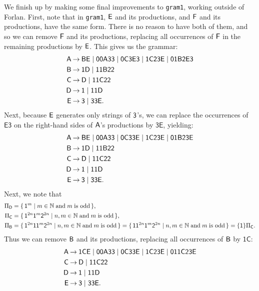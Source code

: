 We finish up by making some final improvements to \texttt{gram1},
working outside of Forlan. First, note that in \texttt{gram1}, $\mathsf{E}$
and its productions, and $\mathsf{F}$ and its productions, have the same
form. There is no reason to have both of them, and so we can remove
$\mathsf{F}$ and its productions, replacing all occurrences of $\mathsf{F}$ in
the remaining productions by $\mathsf{E}$. This gives us the grammar:
\begin{align*}
\mathsf{A} &\mathbin{\to} \mathsf{BE} \mid \mathsf{00A33} \mid \mathsf{0C3E3} \mid
  \mathsf{1C23E} \mid \mathsf{01B2E3} \\
\mathsf{B} &\mathbin{\to} \mathsf{1D} \mid \mathsf{11B22} \\
\mathsf{C} &\mathbin{\to} \mathsf{D} \mid \mathsf{11C22} \\
\mathsf{D} &\mathbin{\to} \mathsf{1} \mid \mathsf{11D} \\
\mathsf{E} &\mathbin{\to} \mathsf{3} \mid \mathsf{33E} .
\end{align*}
Next, because $\mathsf{E}$ generates only strings of $\mathsf{3}$'s, we
can replace the occurrences of $\mathsf{E3}$ on the right-hand sides
of $\mathsf{A}$'s productions by $\mathsf{3E}$, yielding:
\begin{align*}
\mathsf{A} &\mathbin{\to} \mathsf{BE} \mid \mathsf{00A33} \mid \mathsf{0C33E} \mid
  \mathsf{1C23E} \mid \mathsf{01B23E} \\
\mathsf{B} &\mathbin{\to} \mathsf{1D} \mid \mathsf{11B22} \\
\mathsf{C} &\mathbin{\to} \mathsf{D} \mid \mathsf{11C22} \\
\mathsf{D} &\mathbin{\to} \mathsf{1} \mid \mathsf{11D} \\
\mathsf{E} &\mathbin{\to} \mathsf{3} \mid \mathsf{33E} .
\end{align*}
Next, we note that
\begin{align*}
  \Pi_{\mathsf{D}} &= \{ \, \mathsf{1}^m \mid m\in\mathbb{N}\;\allowbreak\mbox{and}\allowbreak\; m \;\allowbreak\mbox{is odd}\allowbreak \, \} , \\
  \Pi_{\mathsf{C}} &= \{ \, \mathsf{1}^{2n}\mathsf{1}^m\mathsf{2}^{2n} \mid n,m\in\mathbb{N}\;\allowbreak\mbox{and}\allowbreak\;
    m \;\allowbreak\mbox{is odd}\allowbreak \, \} , \\
  \Pi_{\mathsf{B}} &= \{ \, \mathsf{1}^{2n}\mathsf{1}\mathsf{1}^m\mathsf{2}^{2n} \mid n,m\in\mathbb{N}\;\allowbreak\mbox{and}\allowbreak\;
    m \;\allowbreak\mbox{is odd}\allowbreak \, \} =
    \{ \, \mathsf{1}\mathsf{1}^{2n}\mathsf{1}^m\mathsf{2}^{2n} \mid n,m\in\mathbb{N}\;\allowbreak\mbox{and}\allowbreak\;
    m \;\allowbreak\mbox{is odd}\allowbreak \, \} = \{\mathsf{1}\}\Pi_{\mathsf{C}} .
\end{align*}
Thus we can remove $\mathsf{B}$ and its productions, replacing all occurrences of
$\mathsf{B}$ by $\mathsf{1C}$:
\begin{align*}
\mathsf{A} &\mathbin{\to} \mathsf{1CE} \mid \mathsf{00A33} \mid \mathsf{0C33E} \mid
  \mathsf{1C23E} \mid \mathsf{011C23E} \\
\mathsf{C} &\mathbin{\to} \mathsf{D} \mid \mathsf{11C22} \\
\mathsf{D} &\mathbin{\to} \mathsf{1} \mid \mathsf{11D} \\
\mathsf{E} &\mathbin{\to} \mathsf{3} \mid \mathsf{33E} .
\end{align*}
